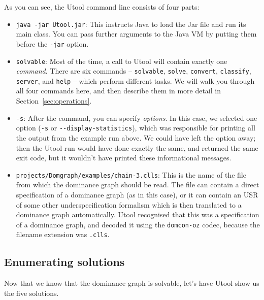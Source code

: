 As you can see, the Utool command line consists of four parts:
\begin{itemize}
\item \verb?java -jar Utool.jar?: This instructs Java to load the Jar
file and run its main class. You can pass further arguments to the
Java VM by putting them before the \verb?-jar? option.
\item \verb?solvable?: Most of the time, a call to Utool will contain
exactly one \emph{command}. There are six commands -- \verb?solvable?,
\verb?solve?, \verb?convert?, \verb?classify?, \verb?server?, and
\verb?help? -- which perform different tasks. We will walk you through
all four commands here, and then describe them in more detail in
Section~\ref{sec:operations}.
\item \verb?-s?: After the command, you can specify \emph{options}. In
this case, we selected one option (\verb?-s? or
\verb?--display-statistics?), which was responsible for printing all
the output from the example run above. We could have left the option
away; then the Utool run would have done exactly the same, and
returned the same exit code, but it wouldn't have printed these
informational messages.
\item \verb?projects/Domgraph/examples/chain-3.clls?: This is the name
of the file from which the dominance graph should be read. The file
can contain a direct specification of a dominance graph (as in this
case), or it can contain an USR of some other underspecification
formalism which is then translated to a dominance graph
automatically. Utool recognised that this was a specification of a
dominance graph, and decoded it using the \verb?domcon-oz? codec,
because the filename extension was \verb?.clls?.
\end{itemize}



\subsection{Enumerating solutions}

Now that we know that the dominance graph is solvable, let's have
Utool show us the five solutions.







